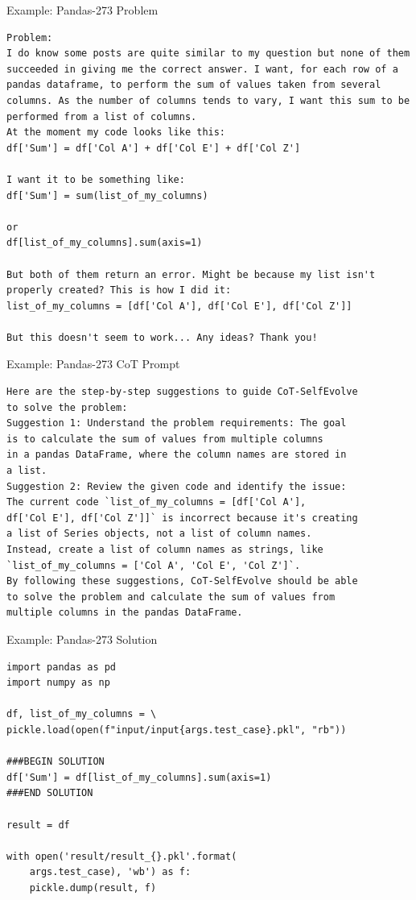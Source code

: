 \begin{frame}[fragile]{Example: Pandas-273 Problem}
    \begin{verbatim}
Problem:
I do know some posts are quite similar to my question but none of them succeeded in giving me the correct answer. I want, for each row of a pandas dataframe, to perform the sum of values taken from several columns. As the number of columns tends to vary, I want this sum to be performed from a list of columns.
At the moment my code looks like this:
df['Sum'] = df['Col A'] + df['Col E'] + df['Col Z']

I want it to be something like:
df['Sum'] = sum(list_of_my_columns)

or
df[list_of_my_columns].sum(axis=1)

But both of them return an error. Might be because my list isn't properly created? This is how I did it:
list_of_my_columns = [df['Col A'], df['Col E'], df['Col Z']]

But this doesn't seem to work... Any ideas? Thank you!
    \end{verbatim}
\end{frame}

\begin{frame}[fragile]{Example: Pandas-273 CoT Prompt}
    \begin{verbatim}
Here are the step-by-step suggestions to guide CoT-SelfEvolve
to solve the problem:
Suggestion 1: Understand the problem requirements: The goal
is to calculate the sum of values from multiple columns
in a pandas DataFrame, where the column names are stored in
a list.
Suggestion 2: Review the given code and identify the issue:
The current code `list_of_my_columns = [df['Col A'],
df['Col E'], df['Col Z']]` is incorrect because it's creating
a list of Series objects, not a list of column names.
Instead, create a list of column names as strings, like
`list_of_my_columns = ['Col A', 'Col E', 'Col Z']`.
By following these suggestions, CoT-SelfEvolve should be able
to solve the problem and calculate the sum of values from
multiple columns in the pandas DataFrame.
    \end{verbatim}
\end{frame}

\begin{frame}[fragile]{Example: Pandas-273 Solution}
    \begin{verbatim}
import pandas as pd
import numpy as np

df, list_of_my_columns = \
pickle.load(open(f"input/input{args.test_case}.pkl", "rb"))

###BEGIN SOLUTION
df['Sum'] = df[list_of_my_columns].sum(axis=1)
###END SOLUTION

result = df

with open('result/result_{}.pkl'.format(
    args.test_case), 'wb') as f:
    pickle.dump(result, f)
    \end{verbatim}
\end{frame}

